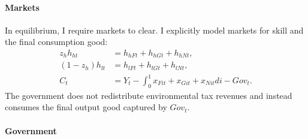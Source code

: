 \begin{comment}
\paragraph{Impossibility of reaching target in laissez-faire with exogenous growth}
\tr{Note that this is wrong! There is an option for the gov to affect inflation which then redirects demand.}
Note that with exogenous growth in each sector there is no possibility for the government to stop emissions from growing, since production of the dirty good is essential for the consumption good (no perfect substitution: $\varepsilon<\infty$). To meet the emission target, the government either needs to affect the growth rate in the economy; i.e., $\upsilon_j$ is a choice variable, or work and consumption need to be set to zero; or the emission target has to be defined in relative terms. The latter possibility contradicts the Paris Agreement which is concerned with absolute emissions.  
I therefore assume, that the government can change the growth rate.

The government chooses the growth rate in each sector, taking into account that research is constrained by an exogenous  amount of scientists
\begin{align}
\upsilon_{ct}+\upsilon_{dt}\leq\Upsilon
\end{align}
\end{comment} 
  
\paragraph{Markets}
In equilibrium, I require markets to clear. I explicitly model markets for skill and the final consumption good:
\begin{align}
z_h h_{ht}&=h_{hFt}+h_{hGt}+h_{hNt},\\
(1-z_h) h_{lt}&=h_{lFt}+h_{lGt}+h_{lNt},\\
C_t&=Y_t-\int_{0}^{1}x_{Fit}+x_{Git}+x_{Nit}di-Gov_t.
\end{align}
The government does not redistribute environmental tax revenues and instead consumes the final output good captured by $Gov_t$. 

\paragraph{Government}

